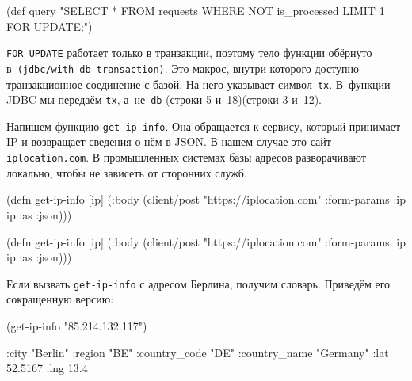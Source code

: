\else

\begin{english}
  \begin{clojure}
(def query
  "SELECT * FROM requests WHERE NOT is_processed
   LIMIT 1 FOR UPDATE;")
  \end{clojure}
\end{english}

\fi

\verb|FOR UPDATE| работает только в транзакции, поэтому тело функции обёрнуто
в~\texttt{(jdbc/with\--db-transaction)}. Это макрос, внутри которого доступно
транзакционное соединение с базой. На него указывает символ~\verb|tx|. В~функции
JDBC мы передаём \verb|tx|, а~не~\verb|db| \ifx\DEVICETYPE\MOBILE(строки 5 и~18)\else(строки 3 и~12)\fi.


Напишем функцию \verb|get-ip-info|. Она обращается к сервису, который принимает
IP и возвращает сведения о нём в JSON. В нашем случае это сайт
\verb|iplocation.com|. В промышленных системах базы адресов разворачивают
локально, чтобы не зависеть от сторонних служб.

\ifx\DEVICETYPE\MOBILE

\begin{english}
  \begin{clojure}
(defn get-ip-info [ip]
  (:body (client/post
           "https://iplocation.com"
           {:form-params {:ip ip}
            :as :json})))
  \end{clojure}
\end{english}

\else

\begin{english}
  \begin{clojure}
(defn get-ip-info [ip]
  (:body (client/post "https://iplocation.com"
                      {:form-params {:ip ip}
                       :as :json})))
  \end{clojure}
\end{english}

\fi

\noindent
Если вызвать \verb|get-ip-info| с адресом Берлина, получим словарь. Приведём его
сокращенную версию:

\begin{english}
  \begin{clojure}
(get-ip-info "85.214.132.117")

{:city "Berlin"
 :region "BE"
 :country_code "DE"
 :country_name "Germany"
 :lat 52.5167
 :lng 13.4}
  \end{clojure}
\end{english}

